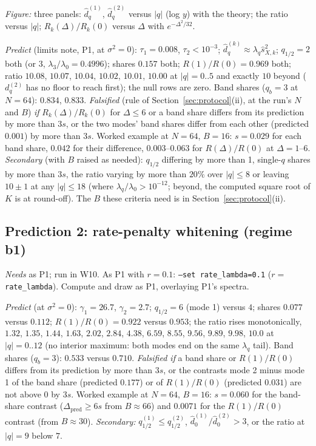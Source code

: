\documentclass[11pt,a4paper]{article}
\newcommand{\code}[1]{\texttt{#1}}
\begin{document}
\emph{Figure:} three panels: $\hat d^{(1)}_q$, $\hat d^{(2)}_q$ versus $|q|$ (log $y$) with the theory; the ratio versus $|q|$; $R_k(\Delta)/R_k(0)$ versus $\Delta$ with $e^{-\Delta^2/32}$.

\emph{Predict} (limits note, P1, at $\sigma^2 = 0$): $\tau_1 = 0.008$, $\tau_2 < 10^{-3}$; $\hat d^{(k)}_q\approx\lambda_q\hat s_{X,k}^2$; $q_{1/2} = 2$ both (or $3$, $\lambda_3/\lambda_0 = 0.4996$); shares $0.157$ both; $R(1)/R(0) = 0.969$ both; ratio $10.08$, $10.07$, $10.04$, $10.02$, $10.01$, $10.00$ at $|q| = 0..5$ and exactly $10$ beyond ($d^{(2)}_q$ has no floor to reach first); the null rows are zero. Band shares ($q_b = 3$ at $N = 64$): $0.834$, $0.833$. \emph{Falsified} (rule of Section~\ref{sec:protocol}(ii), at the run's $N$ and $B$) \emph{if} $R_k(\Delta)/R_k(0)$ for $\Delta\le6$ or a band share differs from its prediction by more than $3s$, or the two modes' band shares differ from each other (predicted $0.001$) by more than $3s$. Worked example at $N = 64$, $B = 16$: $s = 0.029$ for each band share, $0.042$ for their difference, $0.003$--$0.063$ for $R(\Delta)/R(0)$ at $\Delta = 1$--$6$. \emph{Secondary} (with $B$ raised as needed): $q_{1/2}$ differing by more than 1, single-$q$ shares by more than $3s$, the ratio varying by more than $20\%$ over $|q|\le8$ or leaving $10\pm1$ at any $|q|\le18$ (where $\lambda_q/\lambda_0 > 10^{-12}$; beyond, the computed square root of $K$ is at round-off). The $B$ these criteria need is in Section~\ref{sec:protocol}(ii).

\subsection{Prediction 2: rate-penalty whitening (regime b1)}
\label{sec:P2}
\emph{Needs} as P1; run in W10. As P1 with $r = 0.1$: \code{--set rate\_lambda=0.1} ($r = $ \code{rate\_lambda}). Compute and draw as P1, overlaying P1's spectra.

\emph{Predict} (at $\sigma^2 = 0$): $\gamma_1 = 26.7$, $\gamma_2 = 2.7$; $q_{1/2} = 6$ (mode 1) versus $4$; shares $0.077$ versus $0.112$; $R(1)/R(0) = 0.922$ versus $0.953$; the ratio rises monotonically, $1.32$, $1.35$, $1.44$, $1.63$, $2.02$, $2.84$, $4.38$, $6.59$, $8.55$, $9.56$, $9.89$, $9.98$, $10.0$ at $|q| = 0..12$ (no interior maximum: both modes end on the same $\lambda_q$ tail). Band shares ($q_b = 3$): $0.533$ versus $0.710$. \emph{Falsified if} a band share or $R(1)/R(0)$ differs from its prediction by more than $3s$, or the contrasts mode 2 minus mode 1 of the band share (predicted $0.177$) or of $R(1)/R(0)$ (predicted $0.031$) are not above $0$ by $3s$. Worked example at $N = 64$, $B = 16$: $s = 0.060$ for the band-share contrast ($\Delta_{\mathrm{pred}}\ge6s$ from $B\approx66$) and $0.0071$ for the $R(1)/R(0)$ contrast (from $B\approx30$). \emph{Secondary:} $q^{(1)}_{1/2}\le q^{(2)}_{1/2}$, $\hat d_0^{(1)}/\hat d_0^{(2)} > 3$, or the ratio at $|q| = 9$ below $7$.
\end{document}
